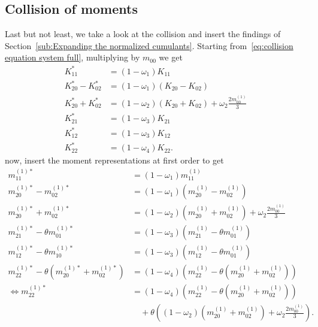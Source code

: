 \subsection{Collision of moments}
\label{sub:Collision of moments}
Last but not least, we take a look at the collision and insert the findings of Section~\ref{sub:Expanding the normalized cumulants}.
Starting from~\eqref{eq:collision equation system full}, multiplying by $m_{00}$ we get
\begin{equation}
  \begin{aligned}
    K_{11}^{*} & = (1-\omega_1)K_{11} \\
    K_{20}^{*} - K_{02}^{*} & = (1-\omega_1) (K_{20} - K_{02}) \\
    K_{20}^{*} + K_{02}^{*} & = (1-\omega_2) (K_{20} + K_{02}) + \omega_2 \frac{2 m_{00}^{(1)}}{3} \\
    K_{21}^{*} & = (1-\omega_3)K_{21} \\
    K_{12}^{*} & = (1-\omega_3)K_{12} \\
    K_{22}^{*} & = (1-\omega_4)K_{22}.
  \end{aligned}
\end{equation}
now, insert the moment representations at first order to get
\begin{equation}
  \begin{aligned}
    m_{11}^{(1)*}
    & = (1-\omega_1)m_{11}^{(1)} \\
%
    m_{20}^{(1)*} - m_{02}^{(1)*}
    & = (1-\omega_1) (m_{20}^{(1)} - m_{02}^{(1)}) \\
%
    m_{20}^{(1)*} + m_{02}^{(1)*}
    & = (1-\omega_2) (m_{20}^{(1)} + m_{02}^{(1)}) + \omega_2 \frac{2 m_{00}^{(1)}}{3} \\
%
    m_{21}^{(1)*} - \theta m_{01}^{(1)*}
    & = (1-\omega_3)(m_{21}^{(1)} - \theta m_{01}^{(1)}) \\
%
    m_{12}^{(1)*} - \theta m_{10}^{(1)*}
    & = (1-\omega_3)(m_{12}^{(1)} - \theta m_{01}^{(1)}) \\
%
    m_{22}^{(1)*} - \theta (m_{20}^{(1)*} + m_{02}^{(1)*})
    & = (1-\omega_4)(m_{22}^{(1)} - \theta (m_{20}^{(1)} + m_{02}^{(1)})) \\
\Leftrightarrow
    m_{22}^{(1)*}
    & = (1-\omega_4)(m_{22}^{(1)} - \theta (m_{20}^{(1)} + m_{02}^{(1)}))
    \\&\quad
    + \theta ((1-\omega_2) (m_{20}^{(1)} + m_{02}^{(1)}) + \omega_2 \frac{2 m_{00}^{(1)}}{3}) .
  \end{aligned}
\end{equation}
